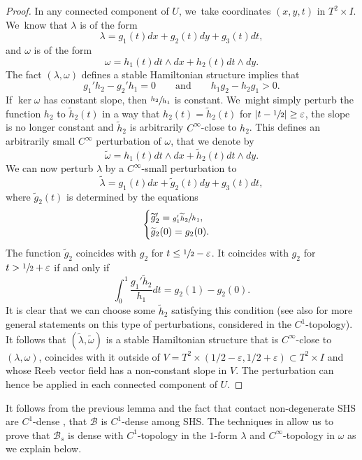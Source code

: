 \documentclass[10pt]{amsart}
\theoremstyle{definition}
\begin{document}
\begin{proof}
In any connected component of $U$, we~take coordinates $(x,y,t)$ in $T^2\times I$. We~know that $\lambda$ is of the form
\[
\lambda= g_1(t) dx + g_2(t) dy + g_3(t)dt,
\]
and $\omega$ is of the form
\[
\omega= h_1(t)dt\wedge dx + h_2(t)dt\wedge dy.
\]
The fact $(\lambda,\omega)$ defines a stable Hamiltonian structure implies that
\[
g_1'h_2-g_2'h_1=0 \qquad \mbox{and} \qquad h_1g_2-h_2g_1>0.
\]
If $\ker \omega$ has constant slope, then $\sfrac{h_2}{h_1}$ is constant. We~might simply perturb the function $h_2$ to $\widetilde h_2(t)$ in a way that $h_2(t)=\widetilde h_2(t)$ for $|t-\sfrac{1}{2}|\geq \varepsilon$, the slope is no longer constant and $\widetilde h_2$ is arbitrarily $C^\infty$-close to $h_2$. This defines an arbitrarily small $C^\infty$ perturbation of $\omega$, that we denote by
\[
\widetilde \omega= h_1(t) dt\wedge dx + \widetilde h_2(t) dt\wedge dy.
\]
We can now perturb $\lambda$ by a $C^\infty$-small perturbation to
\[
\widetilde \lambda= g_1(t)dx+ \widetilde g_2(t)dy+g_3(t)dt,
\]
where $\widetilde g_2(t)$ is determined by the equations
\begin{equation*}
\begin{cases}
\widetilde g_2'=\sfrac{g_1'\widetilde h_2}{h_1},\\
\widetilde g_2(0)=g_2(0).
\end{cases}
\end{equation*}
The function $\widetilde g_2$ coincides with $g_2$ for $t\leq \sfrac{1}{2}-\varepsilon$. It coincides with $g_2$ for $t > \sfrac{1}{2}+\varepsilon$ if and only if
\[
\int_0^1 \frac{g_1'\widetilde h_2}{h_1}dt=g_2(1)-g_2(0).
\]
It is clear that we can choose some $\widetilde h_2$ satisfying this condition (see also \cite[Lem.\,3.15]{CV1} for more general statements on this type of perturbations, considered in the $C^1$\nobreakdash-topo\-logy). It follows that $(\widetilde \lambda,\widetilde \omega)$ is a stable Hamiltonian structure that is $C^\infty$-close to $(\lambda,\omega)$, coincides with it outside of $V=T^2\times(1/2-\varepsilon,1/2+\varepsilon)\subset T^2\times I$ and whose Reeb vector field has a non-constant slope in $V$. The perturbation can hence be applied in each connected component of $U$.
\end{proof}

It follows from the previous lemma and the fact that contact non-degenerate SHS are $C^1$-dense \cite[Th.\,4.6]{CV1}, that $\mathcal{B}$ is $C^1$-dense among SHS. The techniques in \cite[Th.\,4.6]{CV1} allow us to prove that $\mathcal{B}_s$ is dense with $C^1$-topology in the $1$-form $\lambda$ and $C^\infty$-topology in $\omega$ as we explain below.
\end{document}
